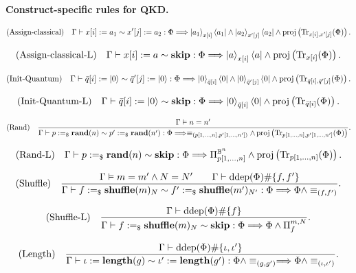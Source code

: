 \documentclass[acmsmall,screen,review,anonymous,nonacm]{acmart}
\theoremstyle{defn_style}
\begin{document}
\textbf{Construct-specific rules for QKD.}


\[
\text{\rm (Assign-classical)}
\quad
\Gamma
\vdash
x[i]:=a_1
\sim
x'[j]:=a_2
:
\Phi
\Longrightarrow
\ket{a_1}_{x[i]}\bra{a_1}
\land
\ket{a_2}_{x'[j]}\bra{a_2}
\land
\operatorname{proj}
\left(
\operatorname{Tr}_{x[i],x'[j]}(\Phi)
\right).
\]

\[
\text{\rm (Assign-classical-L)}
\quad
\Gamma
\vdash
x[i]:=a
\sim
\mathbf{skip}
:
\Phi
\Longrightarrow
\ket a_{x[i]}\bra a
\land
\operatorname{proj}
\left(
\operatorname{Tr}_{x[i]}(\Phi)
\right).
\]

\[
\text{\rm (Init-Quantum)}
\quad
\Gamma
\vdash
\bar q[i]:=\ket 0
\sim
\bar q'[j]:=\ket 0
:
\Phi
\Longrightarrow
\ket 0_{\bar q[i]}\bra 0
\land
\ket 0_{\bar q'[j]}\bra 0
\land
\operatorname{proj}
\left(
\operatorname{Tr}_{\bar q[i],\bar q'[j]}(\Phi)
\right).
\]

\[
\text{\rm (Init-Quantum-L)}
\quad
\Gamma
\vdash
\bar q[i]:=\ket 0
\sim
\mathbf{skip}
:
\Phi
\Longrightarrow
\ket 0_{\bar q[i]}\bra 0
\land
\operatorname{proj}
\left(
\operatorname{Tr}_{\bar q[i]}(\Phi)
\right).
\]



\[
\text{\rm (Rand)}
\quad
\frac{
\Gamma\vDash n=n'
}{
\Gamma
\vdash
p:=_{\$}\mathbf{rand}(n)
\sim
p':=_{\$}\mathbf{rand}(n')
:
\Phi
\Longrightarrow
\equiv_{(p[1,\ldots,n],p'[1,\ldots,n'])}
\land
\operatorname{proj}
\left(
\operatorname{Tr}_{p[1,\ldots,n],p'[1,\ldots,n']}(\Phi)
\right)
}.
\]

\[
\text{\rm (Rand-L)}
\quad
\Gamma
\vdash
p:=_{\$}\mathbf{rand}(n)
\sim
\mathbf{skip}
:
\Phi
\Longrightarrow
\Pi^{\mathbb B^n}_{p[1,\ldots,n]}
\land
\operatorname{proj}
\left(
\operatorname{Tr}_{p[1,\ldots,n]}(\Phi)
\right).
\]


\[
\text{\rm (Shuffle)}
\quad
\frac{
\Gamma
\vDash
m=m'\land N=N'
\qquad
\Gamma\vdash
\operatorname{ddep}(\Phi)\#\{f,f'\}
}{
\Gamma
\vdash
f:=_{\$}\mathbf{shuffle}(m)_N
\sim
f':=_{\$}\mathbf{shuffle}(m')_{N'}
:
\Phi
\Longrightarrow
\Phi\land
\equiv_{(f,f')}
}.
\]

\[
\text{\rm (Shuffle-L)}
\quad
\frac{
\Gamma\vdash
\operatorname{ddep}(\Phi)\#\{f\}
}{
\Gamma
\vdash
f:=_{\$}\mathbf{shuffle}(m)_N
\sim
\mathbf{skip}
:
\Phi
\Longrightarrow
\Phi\land \Pi_f^{m,N}
}.
\]

\[
\text{\rm (Length)}
\quad
\frac{
\Gamma\vdash
\operatorname{ddep}(\Phi)\#\{\iota,\iota'\}
}{
\Gamma
\vdash
\iota:=\mathbf{length}(g)
\sim
\iota':=\mathbf{length}(g')
:
\Phi\land\equiv_{(g,g')}
\Longrightarrow
\Phi\land\equiv_{(\iota,\iota')}
}.
\]
\end{document}
